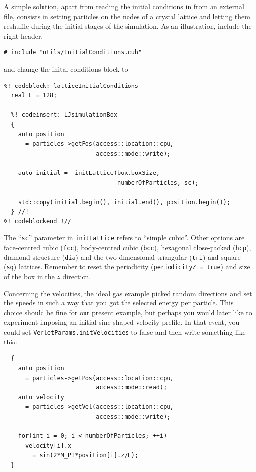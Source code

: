 A simple solution, apart from reading the initial conditions in from an external 
file, consists in setting particles on the nodes of a crystal lattice and 
letting them reshuffle during the initial stages of the simulation. As an
illustration, include the right header,
\begin{lstlisting}
# include "utils/InitialConditions.cuh"
\end{lstlisting}
and change the inital conditions block to
\begin{lstlisting}
%! codeblock: latticeInitialConditions
  real L = 128;

  %! codeinsert: LJsimulationBox
  {
    auto position
      = particles->getPos(access::location::cpu,
                          access::mode::write);

    auto initial =  initLattice(box.boxSize,
                                numberOfParticles, sc);

    std::copy(initial.begin(), initial.end(), position.begin());
  } //!
%! codeblockend !//
\end{lstlisting}
The ``\texttt{sc}'' parameter in \texttt{initLattice} refers to ``simple
cubic''. Other options are face-centred cubic (\texttt{fcc}), body-centred cubic
(\texttt{bcc}), hexagonal close-packed (\texttt{hcp}), diamond structure
(\texttt{dia}) and the two-dimensional triangular (\texttt{tri}) and square
(\texttt{sq}) lattices. Remember to reset the periodicity
(\texttt{periodicityZ = true}) and size of the box in the $z$ direction.

Concerning the velocities, the ideal gas example picked random directions and set
the speeds in such a way that you got the selected energy per particle.
This choice should be fine for our present example, but perhaps you
would later like to experiment imposing an initial sine-shaped velocity profile.
In that event, you could set \texttt{VerletParams.initVelocities} to false and
then write something like this:
\begin{lstlisting}
  {
    auto position
      = particles->getPos(access::location::cpu,
                          access::mode::read);
    auto velocity
      = particles->getVel(access::location::cpu,
                          access::mode::write);

    for(int i = 0; i < numberOfParticles; ++i)
      velocity[i].x
        = sin(2*M_PI*position[i].z/L);
  }
\end{lstlisting}

